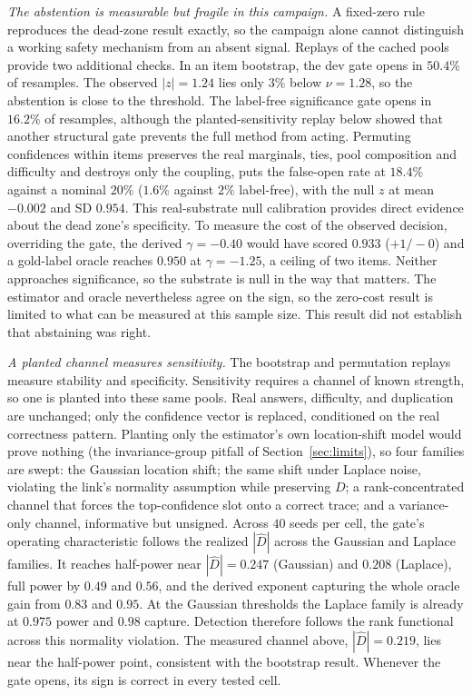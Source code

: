 \documentclass[conference]{IEEEtran}
\newcommand{\Dhat}{\widehat{D}}
\begin{document}
\emph{The abstention is measurable but fragile in this campaign.} A fixed-zero
rule reproduces the dead-zone result exactly, so the campaign alone
cannot distinguish a working safety mechanism from an absent signal. Replays
of the cached pools provide two additional checks. In an item bootstrap, the
dev gate opens in $50.4\%$ of resamples. The observed $|z|=1.24$ lies only
$3\%$ below $\nu=1.28$, so the abstention is close to the threshold. The
label-free significance gate opens in $16.2\%$ of resamples, although the
planted-sensitivity replay below showed that another structural gate prevents
the full method from acting. Permuting confidences within items preserves the
real marginals, ties, pool composition and difficulty and destroys only the
coupling, puts the false-open rate at $18.4\%$ against a nominal $20\%$
($1.6\%$ against $2\%$ label-free), with the null $z$ at mean $-0.002$ and SD
$0.954$. This real-substrate null calibration provides direct evidence about
the dead zone's specificity. To measure the cost of the observed decision,
overriding the gate, the derived $\gamma=-0.40$ would have scored $0.933$
($+1/-0$) and a gold-label oracle reaches $0.950$ at $\gamma=-1.25$, a ceiling
of two items. Neither approaches significance, so the substrate is null in the
way that matters. The estimator and oracle nevertheless agree on the sign, so
the zero-cost result is limited to what can be measured at this sample size.
This result did not establish that abstaining was right.

\emph{A planted channel measures sensitivity.} The bootstrap and permutation
replays measure stability and specificity. Sensitivity requires a channel of
known strength, so one is planted into these same pools. Real answers,
difficulty, and duplication are unchanged;
only the confidence vector is replaced, conditioned on the real correctness
pattern. Planting only the estimator's own location-shift model would prove
nothing (the invariance-group pitfall of Section~\ref{sec:limits}), so four
families are swept: the Gaussian location shift; the same shift under Laplace
noise, violating the link's normality assumption while preserving $D$; a
rank-concentrated channel that forces the top-confidence slot onto a correct
trace; and a variance-only channel, informative but unsigned. Across $40$
seeds per cell, the gate's operating characteristic follows the realized
$|\Dhat|$ across the Gaussian and Laplace families. It reaches half-power near
$|\Dhat|=0.247$ (Gaussian) and $0.208$ (Laplace), full power by $0.49$ and
$0.56$, and the derived exponent capturing the whole oracle gain from $0.83$
and $0.95$. At the Gaussian thresholds the Laplace family is already at
$0.975$ power and $0.98$ capture. Detection therefore follows the rank
functional across this normality violation. The measured channel above,
$|\Dhat|=0.219$, lies near the half-power point, consistent with the bootstrap
result. Whenever the gate opens, its sign is correct in every tested cell.
\end{document}
